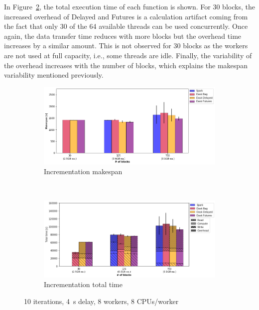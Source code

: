 \documentclass[conference]{IEEEtran}
\begin{document}
In Figure~\ref{fig:inc_tt_block}, the total execution time of each function is shown.
For 30 blocks, the increased overhead of Delayed and Futures is a calculation artifact 
coming from the fact that only 30 of the 64 available threads can be used concurrently. Once again, the data transfer time reduces with more blocks but 
the overhead time increases by a similar amount. This is not observed for 30 blocks
as the workers are not used at full capacity, i.e., some threads are idle. Finally,
the variability of the overhead increases with the number of blocks, which explains
the makespan variability mentioned previously.

\begin{figure}[!t]
    \centering
    \begin{subfigure}[b]{\columnwidth}
        \includegraphics[clip,width=\columnwidth]{images/inc_block.png}%
        \caption{Incrementation makespan}\label{fig:inc_ms_block}
    \end{subfigure}
    \\
    \begin{subfigure}[b]{\columnwidth}
        \includegraphics[clip,width=\columnwidth]{images/inc_idle_block.png}%
        \caption{Incrementation total time}\label{fig:inc_tt_block}
    \end{subfigure}
    \caption{10 iterations, \SI{4}{\second} delay, 8 workers, 8
    CPUs/worker}\label{fig:inc_block}
\end{figure}
\end{document}

